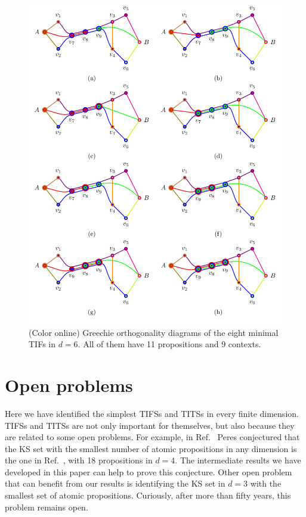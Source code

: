 \documentclass[%
 twocolumn,
 groupedaddress,
 showpacs,
 showkeys,
 preprintnumbers,
 amsmath,amssymb,
 aps,
 pra,
 longbibliography,
 floatfix,
 ]{revtex4-1}
\begin{document}
\begin{figure}
	\includegraphics{2018-minimalYIYS_pra_15REVISEDJR-Fig7.pdf}
	\caption{\label{fig:d6}
		(Color online)
		Greechie orthogonality diagrams of the eight minimal TIFs in $d=6$. All of them have 11 propositions and 9 contexts.}
\end{figure}


\section{Open problems}


Here we have identified the simplest TIFSs and TITSs in every finite dimension. TIFSs and TITSs are not only important for themselves, but also because they are related to some open problems. For example, in Ref.\ \cite{Peres03} Peres conjectured that the KS set with the smallest number of atomic propositions in any dimension is the one in Ref.\ \cite{CEG96}, with 18 propositions in $d=4$. The intermediate results we have developed in this paper can help to prove this conjecture. Other open problem that can benefit from our results is identifying the KS set in $d=3$ with the smallest set of atomic propositions. Curiously, after more than fifty years, this problem remains open.
\end{document}
